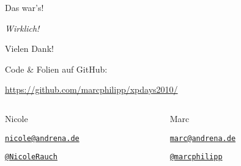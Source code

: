 \begin{frame}
\begin{center}\Huge
Das war's!
\end{center}
\pause
\vspace{.1cm}
\begin{flushright}\Huge
\itshape Wirklich!
\end{flushright}
\end{frame}

\begin{frame}{Vielen Dank!}

	Code \& Folien auf GitHub:
	\begin{center}
		\url{https://github.com/marcphilipp/xpdays2010/}
	\end{center}

\begin{columns}[t] 
\begin{column}{4.6cm} 
	\begin{block}{Nicole}
        \begin{description}[Twitter]
		\item[E-Mail]  \href{mailto:nicole@andrena.de}{\texttt{nicole@andrena.de}}
		\item[Twitter] \href{http://twitter.com/NicoleRauch}{\texttt{@NicoleRauch}}
        \end{description}
	\end{block}
\end{column} 
\begin{column}{4.6cm} 
	\begin{block}{Marc}
        \begin{description}[Twitter]
		\item[E-Mail]  \href{mailto:marc@andrena.de}{\texttt{marc@andrena.de}}
		\item[Twitter] \href{http://twitter.com/marcphilipp}{\texttt{@marcphilipp}}
        \end{description}
	\end{block}
\end{column} 
\end{columns}
\end{frame}

